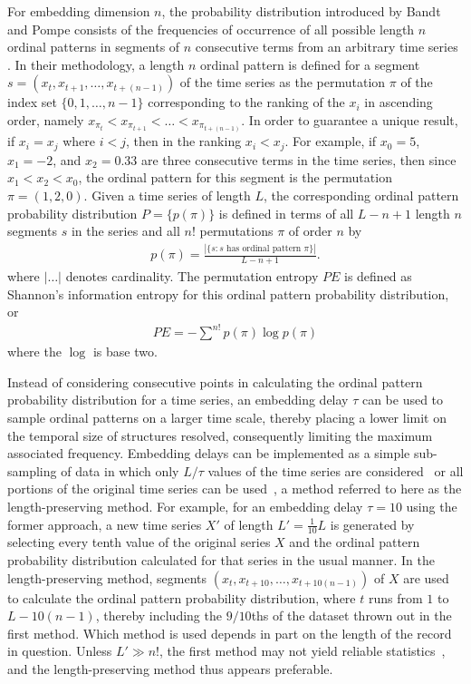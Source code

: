 \documentclass[aps,pre,twocolumn,secnumarabic,nobalancelastpage,amsmath,amssymb,
nofootinbib]{revtex4-1}
\begin{document}
For embedding dimension $n$, the probability distribution introduced by Bandt and Pompe consists of the frequencies of occurrence of all possible length $n$ ordinal patterns in segments of $n$ consecutive terms from an arbitrary time series \cite{bandt2002}. In their methodology, a length $n$ ordinal pattern is defined for a segment $s = ( x_t,x_{t+1},\ldots,x_{t+(n-1)} )$ of the time series as the permutation $\pi$ of the index set $\{0,1,\ldots,n-1 \}$ corresponding to the ranking of the $x_i$ in ascending order, namely $x_{\pi_t}< x_{\pi_{t+1}}<\ldots< x_{\pi_{t+(n-1)}}$. In order to guarantee a unique result, if $x_i = x_j$ where $i<j$, then in the ranking $x_i <x_j$. For example, if $x_0 = 5$,  $x_1= -2$,  and $x_2 = 0.33$ are three consecutive terms in the time series, then since $x_1 < x_2 < x_0$, the ordinal pattern for this segment is the permutation $\pi = (1,2,0)$.  Given a time series of length $L$, the corresponding ordinal pattern probability distribution $P= \{p(\pi) \}$ is defined in terms of all $L-n+1$ length $n$ segments $s$ in the series and all $n!$ permutations $\pi$ of order $n$ by
\begin{align}
p(\pi) = \frac{|\{s: \text{$s$ has ordinal pattern $\pi$}\}| }{L-n+1}. 
\end{align}
where $|\ldots|$ denotes cardinality. The permutation entropy $PE$ is defined as Shannon's information entropy for this ordinal pattern probability distribution, or
\begin{align}
PE  = -\sum^{n!} p(\pi) \log p(\pi)
\end{align}
where the $\log$ is base two.

Instead of considering consecutive points in calculating the ordinal pattern probability distribution for a time series, an embedding delay $\tau$ can be used to sample ordinal patterns on a larger time scale, thereby placing a lower limit on the temporal size of structures resolved, consequently limiting the maximum associated frequency. Embedding delays can be implemented as a simple sub-sampling of data in which only $L/\tau$ values of the time series are considered~\cite{maggs2013,gekelman2014} or all portions of the original time series can be used~\cite{bandt2005}, a method referred to here as the length-preserving method. For example, for an embedding delay $\tau=10$ using the former approach, a new time series $X'$ of length $L'=\frac{1}{10}L$ is generated by selecting every tenth value of the original series $X$ and the ordinal pattern probability distribution calculated for that series in the usual manner. In the length-preserving method, segments $ ( x_t,x_{t+10},\ldots,x_{t+10(n-1)} ) $ of $X$ are used to calculate the ordinal pattern probability distribution, where $t$ runs from $1$ to $L-10(n-1)$, thereby including the $9/10$ths of the dataset thrown out in the first method. Which method is used depends in part on the length of the record in question. Unless  $L' \gg n!$, the first method may not yield reliable statistics~\cite{gekelman2014}, and the length-preserving method thus appears preferable.
\end{document}
